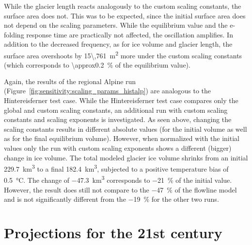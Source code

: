       While the glacier length reacts analogously to the custom scaling constants, the surface area does not. This was to be expected, since the initial surface area does not depend on the scaling parameters. While the equilibrium value and the e-folding response time are practically not affected, the oscillation amplifies. In addition to the decreased frequency, as for ice volume and glacier length, the surface area overshoots by \SI{15\,761}{\square\meter} more under the custom scaling constants (which corresponds to \SI{\approx0.2}{\percent} of the equilibrium value).
      
      Again, the results of the regional Alpine run (Figure~\ref{fig:sensitivity:scaling_params_histalp}) are analogous to the Hintereisferner test case. While the Hintereisferner test case compares only the global and custom scaling constants, an additional run with custom scaling constants and scaling exponents is investigated. As seen above, changing the scaling constants results in different absolute values (for the initial volume as well as for the final equilibrium volume). However, when normalized with the initial values only the run with custom scaling exponents shows a different (bigger) change in ice volume. The total modeled glacier ice volume shrinks from an initial \SI{229.7}{\cubic\kilo\meter} to a final \SI{182.4}{\cubic\kilo\meter}, subjected to a positive temperature bias of \SI{+0.5}{\celsius}. The change of \SI{-47.3}{\cubic\kilo\meter} corresponds to \SI{-21}{\percent} of the initial value. However, the result does still not compare to the \SI{-47}{\percent} of the flowline model and is not significantly different from the \SI{-19}{\percent} for the other two \vas{} runs.


  \section{Projections for the 21st century} %
  \label{sec:projections_for_the_21st_century}

